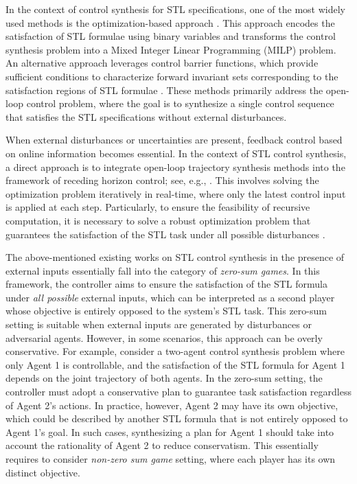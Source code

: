 \documentclass[letterpaper, 10 pt, conference]{ieeeconf}
\begin{document}
In the context of control synthesis for STL specifications, one of the most widely used methods is the optimization-based approach \cite{raman2014model, kurtz2022mixed}. This approach encodes the satisfaction of STL formulae using binary variables and transforms the control synthesis problem into a Mixed Integer Linear Programming (MILP) problem. An alternative approach leverages control barrier functions, which provide sufficient conditions to characterize forward invariant sets corresponding to the satisfaction regions of STL formulae \cite{lindemann2018control, xiao2021high}. These methods primarily address the open-loop control problem, where the goal is to synthesize a single control sequence that satisfies the STL specifications without external disturbances. 


When external disturbances or uncertainties are present, feedback control based on online information becomes essential. In the context of STL control synthesis, a direct approach is to integrate open-loop trajectory synthesis methods into the framework of receding horizon control; see, e.g.,  \cite{raman2015reactive, lindemann2021reactive, gundana2021event, ilyes2023stochastic, scher2023ensuring, farahani2018shrinking, sadigh2016safe}. This involves solving the optimization problem iteratively in real-time, where only the latest control input is applied at each step. 
Particularly, to ensure the feasibility of recursive computation, it is necessary to solve a robust optimization problem that guarantees the satisfaction of the STL task under all possible disturbances \cite{farahani2018shrinking, ren2022reachability, yu2023model, vlahakis2024probabilistic}. 

The above-mentioned existing works on STL control synthesis in the presence of external inputs essentially fall into the category of \emph{zero-sum games}. In this framework, the controller aims to ensure the satisfaction of the STL formula under \emph{all possible} external inputs, which can be interpreted as a second player whose objective is entirely opposed to the system's STL task. This zero-sum setting is suitable when external inputs are generated by disturbances or adversarial agents. However, in some scenarios, this approach can be overly conservative. For example, consider a two-agent control synthesis problem where only Agent 1 is controllable, and the satisfaction of the STL formula for Agent 1 depends on the joint trajectory of both agents. 
In the zero-sum setting, the controller must adopt a conservative plan to guarantee task satisfaction regardless of Agent 2's actions. In practice, however, Agent 2 may have its own objective, which could be described by another STL formula that is not entirely opposed to Agent 1's goal. In such cases, synthesizing a plan for Agent 1 should take into account the rationality of Agent 2 to reduce conservatism. This essentially requires to consider \emph{non-zero sum game}  setting, where each player has its own distinct objective.
\end{document}
